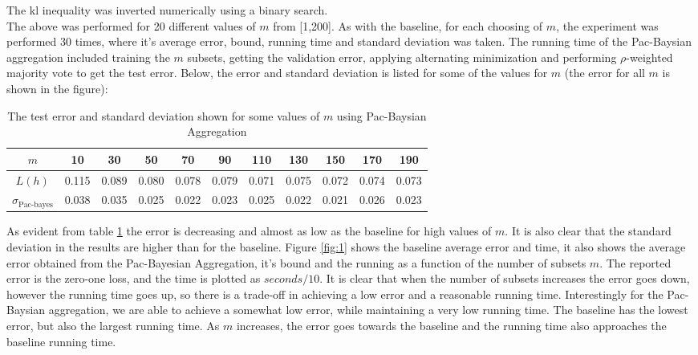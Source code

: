 \documentclass{article}
\begin{document}
The kl inequality was inverted numerically using a binary search. \\
The above was performed for 20 different values of $m$ from [1,200]. As with the baseline, for each choosing of $m$, the experiment was performed 30 times, where it's average error, bound, running time and standard deviation was taken. The running time of the Pac-Baysian aggregation included training the $m$ subsets, getting the validation error, applying alternating minimization and performing $\rho$-weighted majority vote to get the test error. Below, the error and standard deviation is listed for some of the values for $m$ (the error for all $m$ is shown in the figure):
\begin{table}[H]
\centering
\caption{The test error and standard deviation shown for some values of $m$ using Pac-Baysian Aggregation}
\label{tab:2}
    \begin{tabular}{|c|c|c|c|c|c|c|c|c|c|c|}
        \hline
      $m$  & 10 & 30 & 50 & 70 & 90 & 110 & 130 & 150 & 170 & 190
         \\ \hline
       $L(h)$ & 0.115 & 0.089 & 0.080 & 0.078 & 0.079 & 0.071 & 0.075 & 0.072 & 0.074 & 0.073 \\ \hline
$\sigma_{\text{Pac-bayes}}$  & 0.038 & 0.035 & 0.025 & 0.022 & 0.023 & 0.025 & 0.022 & 0.021 & 0.026 & 0.023  \\ \hline
    \end{tabular}
\end{table}
As evident from table \ref{tab:2} the error is decreasing and almost as low as the baseline for high values of $m$. It is also clear that the standard deviation in the results are higher than for the baseline. Figure \ref{fig:1} shows the baseline average error and time, it also shows the average error obtained from the Pac-Bayesian Aggregation, it's bound and the running as a function of the number of subsets $m$. The reported error is the zero-one loss, and the time is plotted as $seconds/10$. It is clear that when the number of subsets increases the error goes down, however the running time goes up, so there is a trade-off in achieving a low error and a reasonable running time. Interestingly for the Pac-Baysian aggregation, we are able to achieve a somewhat low error, while maintaining a very low running time. The baseline has the lowest error, but also the largest running time. As $m$ increases, the error goes towards the baseline and the running time also approaches the baseline running time.
\end{document}
